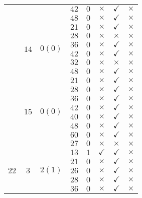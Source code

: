 \documentclass[12pt,a4paper,halfparskip,headsepline,bibtotocnumbered]{scrreprt}
\theoremstyle{nummermitklammern}
\theoremstyle{nonumberbreak}
\begin{document}
\begin{table}[H]
\begin{tabular}{|c|c|c|c|c|c|c|c|}
								&						&							&$42$	&$0$	&$\times$		&$\checkmark$	&$\times$\\ \cline{4-8}
								&						&							&$48$	&$0$	&$\times$		&$\checkmark$	&$\times$\\ \cline{2-8}
								&\multirow{6}{*}{$14$}	&\multirow{6}{*}{$0(0)$}	&$21$	&$0$	&$\times$		&$\checkmark$	&$\times$\\ \cline{4-8}
								&						&							&$28$	&$0$	&$\times$		&$\times$		&$\times$\\ \cline{4-8}
								&						&							&$36$	&$0$	&$\times$		&$\checkmark$	&$\times$\\ \cline{4-8}
								&						&							&$42$	&$0$	&$\times$		&$\checkmark$	&$\times$\\ \cline{4-8}
								&						&							&$32$	&$0$	&$\times$		&$\times$		&$\times$\\ \cline{4-8}
								&						&							&$48$	&$0$	&$\times$		&$\checkmark$	&$\times$\\ \cline{2-8}
								&\multirow{8}{*}{$15$}	&\multirow{8}{*}{$0(0)$}	&$21$	&$0$	&$\times$		&$\checkmark$	&$\times$\\ \cline{4-8}
								&						&							&$28$	&$0$	&$\times$		&$\checkmark$	&$\times$\\ \cline{4-8}
								&						&							&$36$	&$0$	&$\times$		&$\checkmark$	&$\times$\\ \cline{4-8}
								&						&							&$42$	&$0$	&$\times$		&$\checkmark$	&$\times$\\ \cline{4-8}
								&						&							&$40$	&$0$	&$\times$		&$\checkmark$	&$\times$\\ \cline{4-8}
								&						&							&$48$	&$0$	&$\times$		&$\checkmark$	&$\times$\\ \cline{4-8}
								&						&							&$60$	&$0$	&$\times$		&$\checkmark$	&$\times$\\ \cline{4-8}
								&						&							&$27$	&$0$	&$\times$		&$\times$		&$\times$\\ \hline
		\multirow{10}{*}{$22$}&\multirow{10}{*}{$3$}	&\multirow{10}{*}{$2(1)$}	&$13$	&$1$	&$\checkmark$	&$\checkmark$	&$\times$\\ \cline{4-8}
								&						&							&$21$	&$0$	&$\times$		&$\checkmark$	&$\times$\\ \cline{4-8}
								&						&							&$26$	&$0$	&$\times$		&$\checkmark$	&$\times$\\ \cline{4-8}
								&						&							&$28$	&$0$	&$\times$		&$\checkmark$	&$\times$\\ \cline{4-8}
								&						&							&$36$	&$0$	&$\times$		&$\checkmark$	&$\times$\\ \cline{4-8}

\end{tabular}
\end{table}
\end{document}
